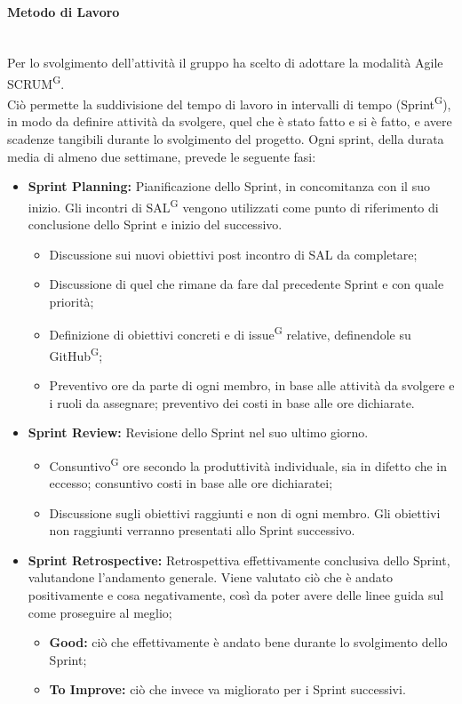 \documentclass[8pt]{article}
\newcommand{\glossterm}[1]{#1\textsuperscript{G}} %
\newcommand{\subsubsubsection}[1]{\paragraph{#1}\mbox{}\\}
\begin{document}
\subsubsubsection{Metodo di Lavoro} \label{sec:metodo_lavoro}
Per lo svolgimento dell'attività il gruppo ha scelto di adottare la modalità Agile \glossterm{SCRUM}. \\
Ciò permette la suddivisione del tempo di lavoro in intervalli di tempo (\glossterm{Sprint}), in modo da definire attività da svolgere, quel che è stato fatto e si è fatto, e avere scadenze tangibili durante lo svolgimento del progetto.
Ogni sprint, della durata media di almeno due settimane, prevede le seguente fasi:
\begin{itemize}
  \item \textbf{Sprint Planning:} Pianificazione dello Sprint, in concomitanza con il suo inizio.
      Gli incontri di \glossterm{SAL} vengono utilizzati come punto di riferimento di conclusione
        dello Sprint e inizio del successivo.
  \begin{itemize}
    \item Discussione sui nuovi obiettivi post incontro di SAL da completare;
    \item Discussione di quel che rimane da fare dal precedente Sprint e con quale priorità;
    \item Definizione di obiettivi concreti e di \glossterm{issue} relative, definendole su
        \glossterm{GitHub};
    \item Preventivo ore da parte di ogni membro, in base alle attività da svolgere e i ruoli da assegnare; preventivo dei costi in base alle ore dichiarate.
  \end{itemize}
  \item \textbf{Sprint Review:} Revisione dello Sprint nel suo ultimo giorno.
  \begin{itemize}
    \item \glossterm{Consuntivo} ore secondo la produttività individuale, sia in difetto che in eccesso;
        consuntivo costi in base alle ore dichiaratei;
    \item Discussione sugli obiettivi raggiunti e non di ogni membro. Gli obiettivi non raggiunti verranno presentati allo Sprint successivo.
  \end{itemize}
  \item \textbf{Sprint Retrospective:} Retrospettiva effettivamente conclusiva dello Sprint,
      valutandone l'andamento generale. Viene valutato ciò che è andato positivamente e cosa
        negativamente, così da poter avere delle linee guida sul come proseguire al meglio;
  \begin{itemize}
      \item \textbf{Good:} ciò che effettivamente è andato bene durante lo svolgimento dello Sprint;
      \item \textbf{To Improve:} ciò che invece va migliorato per i Sprint successivi.
  \end{itemize}
\end{itemize} 
\end{document}

